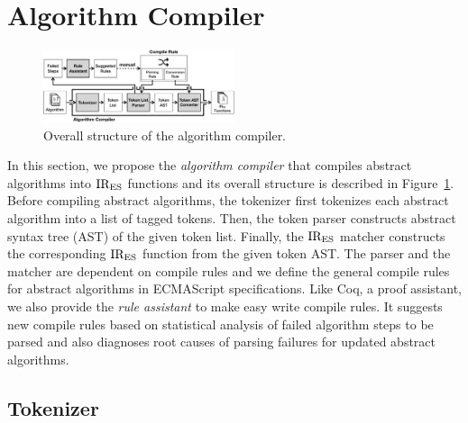 \section{Algorithm Compiler}\label{sec:compiler}

\begin{figure}
  \centering
  \includegraphics[width=0.5\textwidth]{img/algo_compiler.png}
  \caption{Overall structure of the algorithm compiler.}
  \label{fig:algo-compiler}
\end{figure}

In this section, we propose the \textit{algorithm compiler}
that compiles abstract algorithms into \( \text{IR}_\text{ES} \) functions
and its overall structure is described in Figure~\ref{fig:algo-compiler}.
Before compiling abstract algorithms,
the tokenizer first tokenizes each abstract algorithm into
a list of tagged tokens. Then, the token parser constructs
abstract syntax tree (AST) of the given token list.
Finally, the \( \text{IR}_\text{ES} \) matcher constructs the corresponding
\( \text{IR}_\text{ES} \) function from the given token AST.
The parser and the matcher are dependent on compile rules
and we define the general compile rules for abstract algorithms in
ECMAScript specifications. Like Coq, a proof assistant, we also provide
the \textit{rule assistant} to make easy write compile rules.
It suggests new compile rules based on
statistical analysis of failed algorithm steps to be parsed
and also diagnoses root causes of parsing failures
for updated abstract algorithms.

\subsection{Tokenizer}

